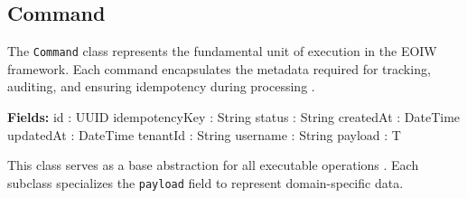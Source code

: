 \subsection{Command}
The \texttt{Command} class represents the fundamental unit of execution
in the EOIW framework. Each command encapsulates the metadata required for
tracking, auditing, and ensuring idempotency during processing .

\begin{algorithm}[H]
\caption{Command (\emph{Class})}
\begin{algorithmic}[1]
    \State \textbf{Fields:}
    \Statex {}
    \State \quad id : UUID
    \State \quad idempotencyKey : String
    \Statex {}
    \State \quad status : String
    \State \quad createdAt : DateTime
    \State \quad updatedAt : DateTime
    \Statex {}
    \State \quad tenantId : String
    \State \quad username : String
    \Statex {}
    \State \quad payload : T
\EndProcedure
\end{algorithmic}
\end{algorithm}

\noindent
This class serves as a base abstraction for all executable operations . Each
subclass specializes the \texttt{payload} field to represent domain-specific data.